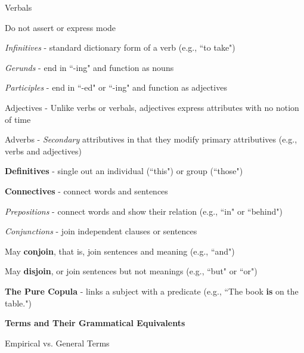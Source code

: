 \documentclass{report}
\begin{document}
\begin{outline}
\begin{outline}
\begin{outline}
\begin{outline}
\begin{outline}
            \end{outline}
           \end{outline}
        \item Verbals
          \begin{outline}
            \item Do not assert or express mode
            \item \textit{Infinitives} - standard dictionary form of a verb (e.g., ``to take")
            \item \textit{Gerunds} -  end in ``-ing" and function as nouns
            \item \textit{Participles} - end in ``-ed" or ``-ing" and function as adjectives
          \end{outline}
        \item Adjectives - Unlike verbs or verbals, adjectives express attributes with no notion of time
        \item Adverbs - \textit{Secondary} attributives in that they modify primary attributives (e.g., verbs and adjectives)
        \end{outline}   
        \newpage
    \item {\bf Definitives} - single out an individual (``this") or group (``those")
    \item {\bf Connectives} - connect words and sentences
      \begin{outline}
        \item \textit{Prepositions} - connect words and show their relation (e.g., ``in" or ``behind")
        \item \textit{Conjunctions} - join independent clauses or sentences
          \begin{outline}
            \item May {\bf conjoin}, that is, join sentences and meaning (e.g., ``and")
            \item May {\bf disjoin}, or join sentences but not meanings (e.g., ``but" or ``or")
          \end{outline}
        \end{outline}
    \item {\bf The Pure Copula} - links a subject with a predicate (e.g., ``The book {\bf is} on the table.")
  \end{outline}
  \item {\bf Terms and Their Grammatical Equivalents}
    \begin{outline}
      \item Empirical vs. General Terms

\end{outline}
\end{outline}
\end{document}
